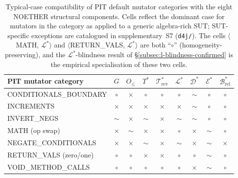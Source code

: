\documentclass[acmsmall,screen,review]{acmart}
\begin{document}
\begin{table}[h]
\centering
\caption{Typical-case compatibility of PIT default mutator categories
with the eight NOETHER structural components. Cells reflect the dominant case for
mutators in the category as applied to a generic algebra-rich SUT;
SUT-specific exceptions are catalogued in
supplementary~S7 (\texttt{d4j/}). The cells $\langle$MATH, $\mathcal{L}^{*}\rangle$
and $\langle$RETURN\_VALS, $\mathcal{L}^{*}\rangle$ are both
``$\circ$'' (homogeneity-preserving), and the
$\mathcal{L}^{*}$-blindness result of \S\ref{subsec:l-blindness-confirmed}
is the empirical specialisation of these two cells.}
\label{tab:pit-block}
\small
\begin{tabular}{lcccccccc}
\toprule
PIT mutator category & $G$ & $O_{\le}$ & $T^{*}$ & $\mathcal{T}^{*}_{\mathrm{rev}}$ & $\mathcal{L}^{*}$ & $\mathcal{D}^{*}$ & $\mathcal{E}^{*}$ & $\mathcal{B}^{*}_{\mathrm{rel}}$ \\
\midrule
CONDITIONALS\_BOUNDARY & $\circ$ & $\times$ & $\circ$ & $\circ$ & $\circ$ & $\sim$ & $\circ$ & $\circ$ \\
INCREMENTS             & $\times$ & $\times$ & $\times$ & $\times$ & $\times$ & $\sim$ & $\circ$ & $\circ$ \\
INVERT\_NEGS           & $\sim$ & $\times$ & $\sim$ & $\times$ & $\sim$ & $\sim$ & $\circ$ & $\circ$ \\
MATH (op swap)         & $\times$ & $\sim$ & $\times$ & $\times$ & $\circ$ & $\times$ & $\sim$ & $\circ$ \\
NEGATE\_CONDITIONALS   & $\times$ & $\times$ & $\sim$ & $\times$ & $\sim$ & $\times$ & $\sim$ & $\times$ \\
RETURN\_VALS (zero/one) & $\circ$ & $\circ$ & $\times$ & $\times$ & $\circ$ & $\circ$ & $\sim$ & $\circ$ \\
VOID\_METHOD\_CALLS    & $\circ$ & $\circ$ & $\circ$ & $\circ$ & $\circ$ & $\times$ & $\sim$ & $\circ$ \\
\bottomrule
\end{tabular}
\end{table}
\end{document}
